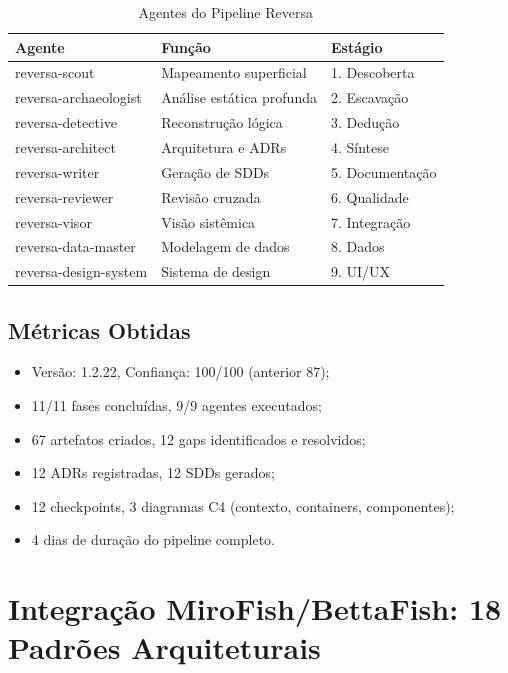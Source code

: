 \documentclass[12pt,a4paper,sumario=tradicional]{abntex2}
\begin{document}
\begin{longtable}{@{}lll@{}}
\caption{Agentes do Pipeline Reversa}\\
\toprule
\textbf{Agente} & \textbf{Função} & \textbf{Estágio} \\
\midrule
reversa-scout & Mapeamento superficial & 1. Descoberta \\
reversa-archaeologist & Análise estática profunda & 2. Escavação \\
reversa-detective & Reconstrução lógica & 3. Dedução \\
reversa-architect & Arquitetura e ADRs & 4. Síntese \\
reversa-writer & Geração de SDDs & 5. Documentação \\
reversa-reviewer & Revisão cruzada & 6. Qualidade \\
reversa-visor & Visão sistêmica & 7. Integração \\
reversa-data-master & Modelagem de dados & 8. Dados \\
reversa-design-system & Sistema de design & 9. UI/UX \\
\bottomrule
\end{longtable}

\section{Métricas Obtidas}

\begin{itemize}
    \item Versão: 1.2.22, Confiança: 100/100 (anterior 87);
    \item 11/11 fases concluídas, 9/9 agentes executados;
    \item 67 artefatos criados, 12 gaps identificados e resolvidos;
    \item 12 ADRs registradas, 12 SDDs gerados;
    \item 12 checkpoints, 3 diagramas C4 (contexto, containers, componentes);
    \item 4 dias de duração do pipeline completo.
\end{itemize}

\chapter{Integração MiroFish/BettaFish: 18 Padrões Arquiteturais}
\end{document}
